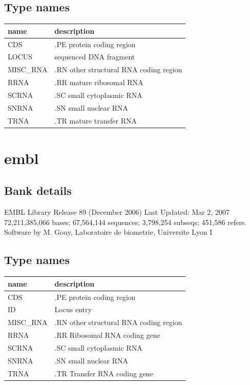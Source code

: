 \documentclass{article}
\begin{document}
\begin{Schunk}
\subsection{Type names}
\noindent\begin{tabular}{ll}
\hline \hline
name & description\\
\hline
CDS & .PE protein coding region \\
LOCUS & sequenced DNA fragment \\
MISC\_RNA & .RN other structural RNA coding region \\
RRNA & .RR mature ribosomal RNA \\
SCRNA & .SC small cytoplasmic RNA \\
SNRNA & .SN small nuclear RNA \\
TRNA & .TR mature transfer RNA \\
\hline \hline
\end{tabular}

\section{ embl }
\subsection{Bank details}
EMBL Library Release 89 (December 2006) Last Updated: Mar  2, 2007\\
72,211,385,066 bases; 67,564,144 sequences; 3,798,254 subseqs; 451,586 refers.\\
Software by M. Gouy, Laboratoire de biometrie, Universite Lyon I

\subsection{Type names}
\noindent\begin{tabular}{ll}
\hline \hline
name & description\\
\hline
CDS & .PE protein coding region \\
ID & Locus entry \\
MISC\_RNA & .RN other structural RNA coding region \\
RRNA & .RR Ribosomal RNA coding gene \\
SCRNA & .SC small cytoplasmic RNA \\
SNRNA & .SN small nuclear RNA \\
TRNA & .TR Transfer RNA coding gene \\
\hline \hline
\end{tabular}


\end{Schunk}
\end{document}
